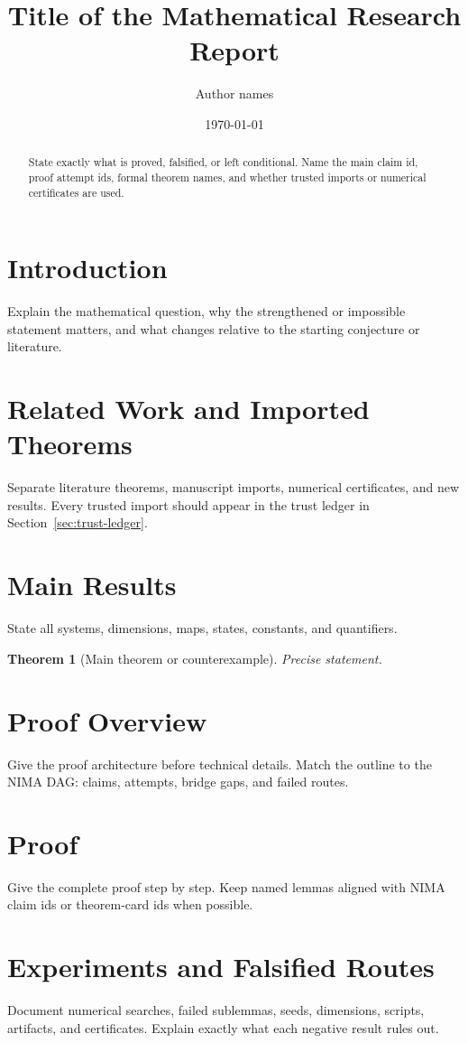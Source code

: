 \documentclass[11pt]{article}
\title{Title of the Mathematical Research Report}
\author{Author names}
\date{\today}
\newtheorem{theorem}{Theorem}
\begin{document}
\maketitle

\begin{abstract}
State exactly what is proved, falsified, or left conditional. Name the main
claim id, proof attempt ids, formal theorem names, and whether trusted imports
or numerical certificates are used.
\end{abstract}

\section{Introduction}
Explain the mathematical question, why the strengthened or impossible statement
matters, and what changes relative to the starting conjecture or literature.

\section{Related Work and Imported Theorems}
Separate literature theorems, manuscript imports, numerical certificates, and
new results. Every trusted import should appear in the trust ledger in
Section~\ref{sec:trust-ledger}.

\section{Main Results}
State all systems, dimensions, maps, states, constants, and quantifiers.

\begin{theorem}[Main theorem or counterexample]
Precise statement.
\end{theorem}

\section{Proof Overview}
Give the proof architecture before technical details. Match the outline to the
NIMA DAG: claims, attempts, bridge gaps, and failed routes.

\section{Proof}
Give the complete proof step by step. Keep named lemmas aligned with NIMA
claim ids or theorem-card ids when possible.

\section{Experiments and Falsified Routes}
Document numerical searches, failed sublemmas, seeds, dimensions, scripts,
artifacts, and certificates. Explain exactly what each negative result rules
out.
\end{document}

